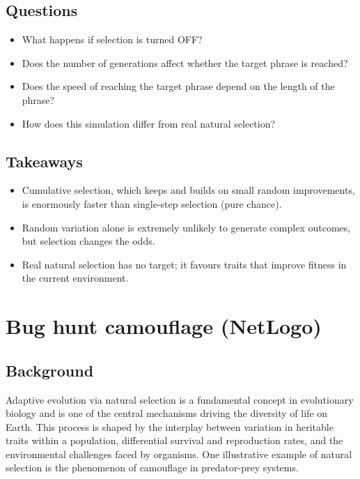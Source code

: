 \documentclass[
  a4paper]{book}
\providecommand{\tightlist}{%
  \setlength{\itemsep}{0pt}\setlength{\parskip}{0pt}}
\begin{document}
\section{Questions}\label{questions}

\begin{itemize}
\tightlist
\item
  What happens if selection is turned OFF?
\item
  Does the number of generations affect whether the target phrase is reached?
\item
  Does the speed of reaching the target phrase depend on the length of the phrase?
\item
  How does this simulation differ from real natural selection?
\end{itemize}

\section{Takeaways}\label{takeaways}

\begin{itemize}
\tightlist
\item
  Cumulative selection, which keeps and builds on small random improvements, is enormously faster than single-step selection (pure chance).
\item
  Random variation alone is extremely unlikely to generate complex outcomes, but selection changes the odds.
\item
  Real natural selection has no target; it favours traits that improve fitness in the current environment.
\end{itemize}

\chapter{Bug hunt camouflage (NetLogo)}\label{bug-hunt-camouflage-netlogo}

\section{Background}\label{background-1}

Adaptive evolution via natural selection is a fundamental concept in evolutionary biology and is one of the central mechanisms driving the diversity of life on Earth. This process is shaped by the interplay between variation in heritable traits within a population, differential survival and reproduction rates, and the environmental challenges faced by organisms. One illustrative example of natural selection is the phenomenon of camouflage in predator-prey systems.
\end{document}
